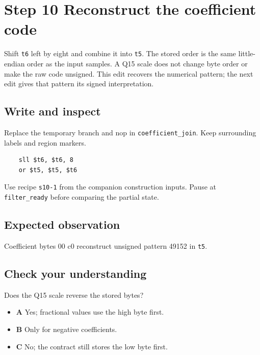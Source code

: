 \section{Step 10 Reconstruct the coefficient code}\label{fir-s10}

Shift \texttt{t6} left by eight and combine it into \texttt{t5}. The stored order is the same little-endian order as the input samples. A Q15 scale does not change byte order or make the raw code unsigned. This edit recovers the numerical pattern; the next edit gives that pattern its signed interpretation.

\subsection{Write and inspect}
Replace the temporary branch and nop in \texttt{coefficient\_join}. Keep surrounding labels and region markers.

\begin{verbatim}
    sll $t6, $t6, 8
    or $t5, $t5, $t6
\end{verbatim}
Use recipe \texttt{s10-1} from the companion construction inputs. Pause at \texttt{filter\_ready} before comparing the partial state.

\subsection{Expected observation}
Coefficient bytes 00 c0 reconstruct unsigned pattern 49152 in \texttt{t5}.

\subsection{Check your understanding}
Does the Q15 scale reverse the stored bytes?

\begin{itemize}
\item \textbf{A} Yes; fractional values use the high byte first.
\item \textbf{B} Only for negative coefficients.
\item \textbf{C} No; the contract still stores the low byte first.
\end{itemize}
